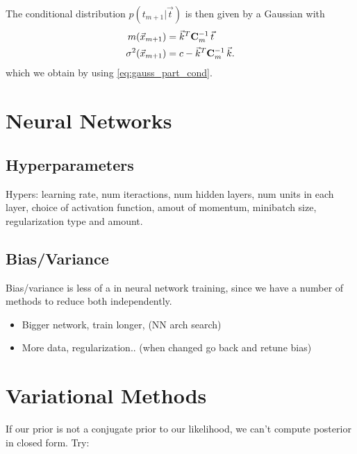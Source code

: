 \documentclass[11pt]{article}
\begin{document}
The conditional distribution $p(t_{m+1} | \vec t)$ is then given by a Gaussian with
\begin{align}
  m(\vec x_{m+1}) &= \vec k^T \mathbf{C}_m^{-1}\, \vec t\\
  \sigma^2 (\vec x_{m+1}) &= c - \vec k^T \mathbf{C}_m^{-1}\, \vec k.
\end{align}
which we obtain by using \ref{eq:gauss_part_cond}. 




\section{Neural Networks}
\label{sec:nn}

\subsection{Hyperparameters}
Hypers: learning rate, num iteractions, num hidden layers, num units in each layer,
choice of activation function, amout of momentum, minibatch size, regularization type
and amount.

\subsection{Bias/Variance}

Bias/variance is less of a  in neural network training, since we have a
number of methods to reduce both independently.
\begin{itemize}
  \item {} Bigger network, train longer, (NN arch
  search)
  \item {} More data, regularization.. (when changed
  go back and retune bias)
\end{itemize}


\section{Variational Methods}
\label{sec:var_meth}

If our prior is not a conjugate prior to our likelihood, we can't compute posterior in
closed form. Try:
\end{document}
